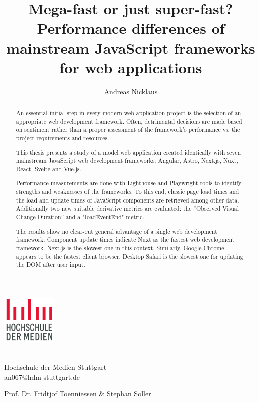 \documentclass[a4paper, 12pt]{article}
\title{Mega-fast or just super-fast? Performance differences of mainstream JavaScript frameworks for web applications}
\author{Andreas Nicklaus}
\makeatletter
\let\Title\@title
\let\Author\@author
\makeatother
\begin{document}
\begin{center}
  \includegraphics[width=100px, keepaspectratio]{img/hdm-logo.png}
\end{center}	
  
\vspace{20px}
\noindent{\Large\bfseries \Title}
\vspace{10px}

\noindent\textbf{\Author}\\
Hochschule der Medien Stuttgart\\
an067@hdm-stuttgart.de 

\vspace{10px}
\noindent Prof. Dr. Fridtjof Toenniessen \& Stephan Soller

\begin{abstract}
  An essential initial step in every modern web application project is the selection of an appropriate web development framework.
  Often, detrimental decisions are made based on sentiment rather than a proper assessment of the framework's performance vs. the project requirements and resources.

  This thesis presents a study of a model web application created identically with seven mainstream JavaScript web development frameworks: Angular, Astro, Next.js, Nuxt, React, Svelte and Vue.js.

  Performance measurements are done with Lighthouse and Playwright tools to identify strengths and weaknesses of the frameworks.
  To this end, classic page load times and the load and update times of JavaScript components are retrieved among other data.
  Additionally two new suitable derivative metrics are evaluated: the \enquote{Observed Visual Change Duration} and a "loadEventEnd" metric.

  The results show no clear-cut general advantage of a single web development framework.
  Component update times indicate Nuxt as the fastest web development framework.
  Next.js is the slowest one in this context.
  Similarly, Google Chrome appears to be the fastest client browser.
  Desktop Safari is the slowest one for updating the DOM after user input.
\end{abstract}

\end{document}
